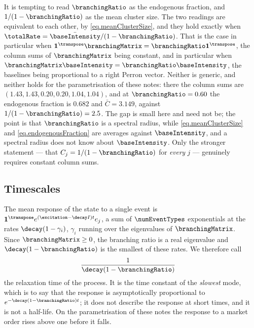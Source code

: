 \begin{remark}\label{remark.rhoIsNot}
 It is tempting to read $\branchingRatio$ as the endogenous fraction,
 and $1/(1-\branchingRatio)$ as the mean cluster size.
 The two readings are equivalent to each other, by \eqref{eq.meanClusterSize},
 and they hold exactly when
 $\totalRate = \bar{\baseIntensity}/(1-\branchingRatio)$.
 That is the case in particular when
 $\mathbf{1}^{\transpose}\branchingMatrix = \branchingRatio \mathbf{1}^{\transpose}$,
 the column sums of $\branchingMatrix$ being constant,
 and in particular when $\branchingMatrix\baseIntensity = \branchingRatio\baseIntensity$,
 the baselines being proportional to a right Perron vector.
 Neither is generic, and neither holds for the parametrisation of these notes:
 there the column sums are $(1.43, 1.43, 0.20, 0.20, 1.04, 1.04)$,
 and at $\branchingRatio = 0.60$ the endogenous fraction is $0.682$ and
 $\bar C = 3.149$, against $1/(1-\branchingRatio) = 2.5$.
 The gap is small here and need not be;
 the point is that $\branchingRatio$ is a spectral radius,
 while \eqref{eq.meanClusterSize} and \eqref{eq.endogenousFraction} are averages against
 $\baseIntensity$, and a spectral radius does not know about $\baseIntensity$.
 Only the stronger statement --- that $C_j = 1/(1-\branchingRatio)$ for \emph{every} $j$ ---
 genuinely requires constant column sums.
\end{remark}

\subsection{Timescales}

The mean response of the state to a single event is
$\mathbf{1}^{\transpose} e^{(\excitation - \decay I)t} e_j$,
a sum of $\numEventTypes$ exponentials at the rates $\decay(1-\gamma_i)$,
$\gamma_i$ running over the eigenvalues of $\branchingMatrix$.
Since $\branchingMatrix \geq 0$, the branching ratio is a real eigenvalue and
$\decay(1-\branchingRatio)$ is the smallest of these rates.
We therefore call
\begin{equation}\label{eq.relaxationTime}
 \frac{1}{\decay(1-\branchingRatio)}
\end{equation}
the relaxation time of the process.
It is the time constant of the \emph{slowest} mode,
which is to say that the response is asymptotically proportional to
$e^{-\decay(1-\branchingRatio)t}$;
it does not describe the response at short times,
and it is not a half-life.
On the parametrisation of these notes the response to a market order rises above one before
it falls.

